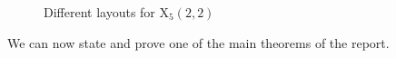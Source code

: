 \begin{figure}[!h]
\centering
\caption{Different layouts for ${\text{X}}_5(2,2)$}
\label{fig2}
\end{figure}
We can now state and prove one of the main theorems of the report.

